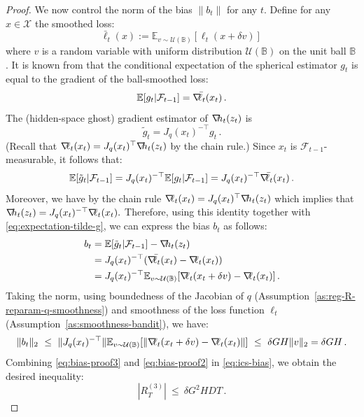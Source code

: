 \documentclass[a4paper,11pt,fullpage]{article}
\def\X{{\mathcal X}}
\theoremstyle{plain}
\theoremstyle{definition}
\theoremstyle{plain}
\renewcommand{\leq}{~\le~}
\let\nablaold\nabla
\renewcommand{\nabla}{\nablaold\mkern-2.5mu}
\begin{document}
\begin{proof}
We now control the norm of the bias $\|b_t\|$ for any $t$. Define for any $x \in \X$ the smoothed loss: 
\begin{equation*}
\bar{\ell}_t(x) := \mathbb{E}_{v \sim \mathcal{U}(\mathbb{B})}[\ell_t(x + \delta v)]\,
\end{equation*}
where $v$ is a random variable with uniform distribution $\mathcal{U}(\mathbb{B})$ on the unit ball $\mathbb{B}$. It is known from \citet[Lemma~1]{flaxman-kalai-mcmahan05} that the conditional expectation of the spherical estimator $g_t$ is equal to the gradient of the ball-smoothed loss: 
\begin{equation*}
\mathbb{E}[g_t |\mathcal{F}_{t-1}] = \nabla \bar{\ell}_t(x_t)\,.
\end{equation*}
The (hidden-space ghost) gradient estimator of $\nabla h_t(z_t)$ is 
\begin{equation*}
\tilde{g}_t = J_q(x_t)^{-\top} g_t\,.
\end{equation*}
(Recall that $\nabla \ell_t(x_t) = J_q(x_t)^{\top} \nabla h_t(z_t)$ by the chain rule.)
Since $x_t$ is $\mathcal{F}_{t-1}$-measurable, it follows that: 
\begin{equation}
\label{eq:expectation-tilde-g}
\mathbb{E}[\tilde{g}_t|\mathcal{F}_{t-1}] = J_q(x_t)^{-\top} \mathbb{E}[g_t|\mathcal{F}_{t-1}] = J_q(x_t)^{-\top} \nabla \bar{\ell}_t(x_t)\,.
\end{equation}
Moreover, we have by the chain rule $\nabla \ell_t(x_t) = J_q(x_t)^{\top} \nabla h_t(z_t)$ which implies that $\nabla h_t(z_t)= J_q(x_t)^{-\top} \nabla \ell_t(x_t).$ Therefore, using this identity together with \eqref{eq:expectation-tilde-g}, we can express the bias $b_t$ as follows: 
\begin{align*}
b_t &= \mathbb{E}[\tilde{g}_t|\mathcal{F}_{t-1}] - \nabla h_t(z_t)\nonumber\\  
&= J_q(x_t)^{-\top} (\nabla \bar{\ell}_t(x_t) - \nabla \ell_t(x_t)) \nonumber\\ 
&= J_q(x_t)^{-\top} \mathbb{E}_{v \sim \mathcal{U}(\mathbb{B})}[\nabla \ell_t(x_t + \delta v) - \nabla \ell_t(x_t) ]\,.
\end{align*}
Taking the norm, using boundedness of the Jacobian of $q$ (Assumption~\ref{as:reg-R-reparam-q-smoothness}) and smoothness of the loss function $\ell_t$ (Assumption~\ref{as:smoothness-bandit}), we have: 
\begin{equation}
\label{eq:bias-proof3}
\|b_t\|_2 \leq \|J_q(x_t)^{-\top}\| \mathbb{E}_{v \sim \mathcal{U}(\mathbb{B})}[\|\nabla \ell_t(x_t + \delta v) - \nabla \ell_t(x_t) \|] \leq \delta G H \|v\|_2 = \delta GH\,. 
\end{equation}
Combining \eqref{eq:bias-proof3} and \eqref{eq:bias-proof2} in \eqref{eq:ics-bias}, we obtain the desired inequality: 
\begin{equation*}
|R_T^{(3)}| \leq \delta G^2 H D T\,.
\end{equation*}
\end{proof}
\end{document}
